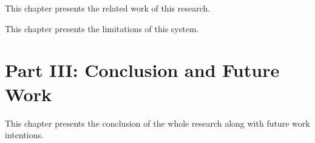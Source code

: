 \noindent  This chapter presents the related work of this research.

  \vspace{1mm}

\noindent  This chapter presents the limitations of this system.

\section*{Part III: Conclusion and Future Work}

  \vspace{1mm}

\noindent  This chapter presents the conclusion of the whole research along with future work intentions.